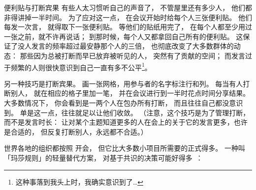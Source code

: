 \begin{aside}{便利贴与打断宾果}
  有些人太习惯听自己的声音了，
  不管屋里还有多少人，
  他们都非得讲掉一半时间。
  为了应对这一点，
  在会议开始时给每个人三张便利贴。
  他们每发一次言，
  就得取下一张便利贴。
  等他们的贴纸用完了，
  在每个人都至少用过一张之前，就不许再说话；
  到那时候，每个人又都拿回自己所有的便利贴。
  这保证了没人发言的频率超过最安静那个人的三倍，
  也彻底改变了大多数群体的动态：
  那些因为总被打断而早已放弃被听见的人，
  突然有了贡献的空间；
  而发言过于频繁的人则很快意识到自己一直有多不公平\footnote{
    这种事落到我头上时，我确实意识到了{\ldots}
  }。

  另一种技巧是打断宾果。
  画一张网格，用参与者的名字标注行和列。
  每当有人打断别人，
  就在相应的格子里加一笔，
  并在会议进行到一半时花点时间分享结果。
  大多数情况下，
  你会看到是一两个人在包办所有打断，
  而且往往自己都没意识到。
  单是这一点，往往就足以让他们收敛。
  （注意，这个技巧是为了管理打断，
  而不是发言时长：
  让对某个主题知道更多的人在会上的关于它的发言更多，也许是合适的，
  但反复打断别人，永远都不合适。）
\end{aside}


世界各地的组织都按照
开会，
但它比大多数小项目所需要的正式得多。
一种叫「玛莎规则」的轻量替代方案，
对基于共识的决策可能好得多~\cite{Mina1986}：

